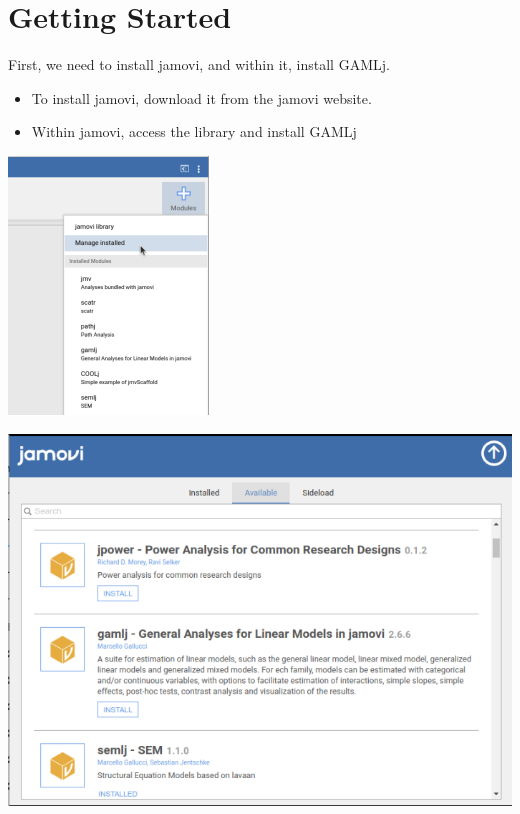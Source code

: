 \documentclass[
]{book}
\begin{document}
\hypertarget{getstarted}{%
\section{Getting Started}\label{getstarted}}

First, we need to install {jamovi}, and within it, install {GAMLj}.

\begin{itemize}
\item
  To install {jamovi}, download it from the jamovi website.
\item
  Within {jamovi}, access the library and install {GAMLj}
\end{itemize}

\begin{center}\includegraphics[width=0.4\linewidth]{bookletpics/0_library1} \end{center}

\begin{center}\includegraphics[width=0.9\linewidth]{bookletpics/0_library2} \end{center}
\end{document}
